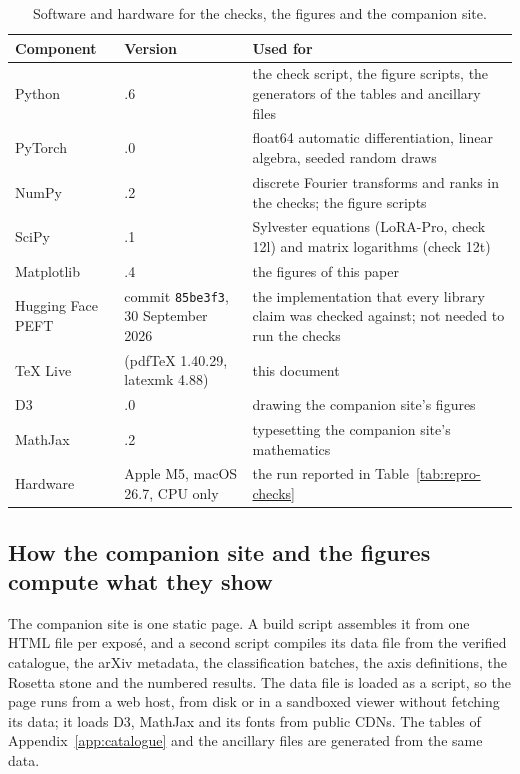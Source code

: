 \begin{table}[t]
\centering\footnotesize
\caption{Software and hardware for the checks, the figures and the companion site.}\label{tab:repro-software}
\begin{tabularx}{\linewidth}{@{}>{\raggedright\arraybackslash}p{3.6cm}>{\raggedright\arraybackslash}p{3.7cm}>{\raggedright\arraybackslash}X@{}}
\toprule\headrow
\textbf{Component} & \textbf{Version} & \textbf{Used for}\\\midrule
Python & 3.9.6 & the check script, the figure scripts, the generators of the tables and ancillary files\\
PyTorch \citep{xpaszke2019pytorch} & 2.8.0 & float64 automatic differentiation, linear algebra, seeded random draws\\
NumPy \citep{xharris2020array} & 2.0.2 & discrete Fourier transforms and ranks in the checks; the figure scripts\\
SciPy \citep{xvirtanen2020scipy} & 1.13.1 & Sylvester equations (LoRA-Pro, check 12l) and matrix logarithms (check 12t)\\
Matplotlib \citep{xhunter2007matplotlib} & 3.9.4 & the figures of this paper\\
Hugging Face PEFT \citep{xmangrulkar2022peft} & commit \texttt{85be3f3}, 30 September 2026 & the implementation that every library claim was checked against; not needed to run the checks\\
TeX Live & 2026 (pdf\TeX{} 1.40.29, latexmk 4.88) & this document\\
D3 \citep{xbostock2011d3} & 7.9.0 & drawing the companion site's figures\\
MathJax \citep{xcervone2012mathjax} & 3.2.2 & typesetting the companion site's mathematics\\
Hardware & Apple M5, macOS 26.7, CPU only & the run reported in Table~\ref{tab:repro-checks}\\
\bottomrule
\end{tabularx}
\end{table}

\subsection{How the companion site and the figures compute what they show}\label{app:repro-site}

The companion site is one static page. A build script assembles it from one HTML file per exposé, and a second script
compiles its data file from the verified catalogue, the arXiv metadata, the classification batches, the axis definitions,
the Rosetta stone and the numbered results. The data file is loaded as a script, so the page runs from a web host, from
disk or in a sandboxed viewer without fetching its data; it loads D3, MathJax and its fonts from public CDNs. The tables of Appendix~\ref{app:catalogue} and the ancillary
files are generated from the same data.

